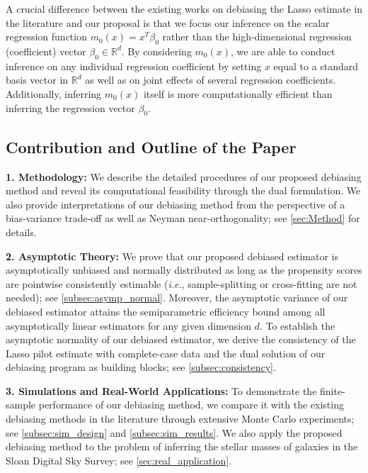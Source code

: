 \documentclass[ejsv2,noshowframe]{imsart}
\theoremstyle{plain}
\theoremstyle{definition}
\theoremstyle{remark}
\begin{document}
A crucial difference between the existing works on debiasing the Lasso estimate in the literature \citep{zhang2014confidence,van2014asymptotically,javanmard2014confidence,javanmard2014hypothesis} and our proposal is that we focus our inference on the scalar regression function $m_0(x)=x^T\beta_0$ rather than the high-dimensional regression (coefficient) vector $\beta_0\in \mathbb{R}^d$. By considering $m_0(x)$, we are able to conduct inference on any individual regression coefficient by setting $x$ equal to a standard basis vector in $\mathbb{R}^d$ as well as on joint effects of several regression coefficients. Additionally, inferring $m_0(x)$ itself is more computationally efficient than inferring the regression vector $\beta_0$.


\subsection{Contribution and Outline of the Paper}

\hspace{8pt} {\bf 1. Methodology:} We describe the detailed procedures of our proposed debiasing method and reveal its computational feasibility through the dual formulation. We also provide interpretations of our debiasing method from the perspective of a bias-variance trade-off as well as Neyman near-orthogonality; see \autoref{sec:Method} for details.	

{\bf 2. Asymptotic Theory:} We prove that our proposed debiased estimator is asymptotically unbiased and normally distributed as long as the propensity scores are pointwise consistently estimable (\emph{i.e.}, sample-splitting or cross-fitting are not needed); see \autoref{subsec:asymp_normal}. Moreover, the asymptotic variance of our debiased estimator attains the semiparametric efficiency bound among all asymptotically linear estimators for any given dimension $d$. To establish the asymptotic normality of our debiased estimator, we derive the consistency of the Lasso pilot estimate with complete-case data and the dual solution of our debiasing program as building blocks; see \autoref{subsec:consistency}.

{\bf 3. Simulations and Real-World Applications:} To demonstrate the finite-sample performance of our debiasing method, we compare it with the existing debiasing methods in the literature through extensive Monte Carlo experiments; see \autoref{subsec:sim_design} and \autoref{subsec:sim_results}. We also apply the proposed debiasing method to the problem of inferring the stellar masses of galaxies in the Sloan Digital Sky Survey; see \autoref{sec:real_application}.
\end{document}
